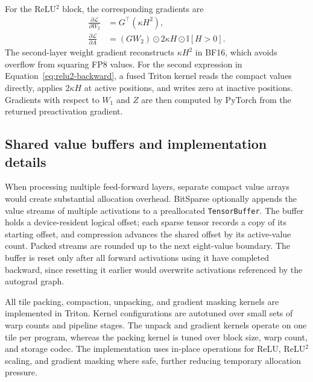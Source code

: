 For the ReLU$^2$ block, the corresponding gradients are
\begin{align}
    \frac{\partial \mathcal{L}}{\partial W_2}
    &= G^\top (\kappa H^2), \\
    \frac{\partial \mathcal{L}}{\partial A}
    &= (GW_2) \odot 2\kappa H \odot \mathbb{I}[H>0].
    \label{eq:relu2-backward}
\end{align}
The second-layer weight gradient reconstructs $\kappa H^2$ in BF16, which
avoids overflow from squaring FP8 values.  For the second expression in
Equation~\eqref{eq:relu2-backward}, a fused Triton kernel reads the compact
values directly, applies $2\kappa H$ at active positions, and writes zero
at inactive positions.  Gradients with respect to $W_1$ and $Z$ are then
computed by PyTorch from the returned preactivation gradient.

\subsection{Shared value buffers and implementation details}
\label{sec:method-buffer}

When processing multiple feed-forward layers, separate compact value arrays
would create substantial allocation overhead.  BitSparse optionally appends
the value streams of multiple activations to a preallocated
\texttt{TensorBuffer}.  The buffer holds a device-resident logical offset;
each sparse tensor records a copy of its starting offset, and compression
advances the shared offset by its active-value count.  Packed streams are
rounded up to the next eight-value boundary.  The buffer is reset only after
all forward activations using it have completed backward, since resetting it
earlier would overwrite activations referenced by the autograd graph.

All tile packing, compaction, unpacking, and gradient masking kernels are
implemented in Triton.  Kernel configurations are autotuned over small sets
of warp counts and pipeline stages.  The unpack and gradient kernels operate
on one tile per program, whereas the packing kernel is tuned over block size,
warp count, and storage codec.  The implementation uses in-place operations
for ReLU, ReLU$^2$ scaling, and gradient masking where safe, further reducing
temporary allocation pressure.
